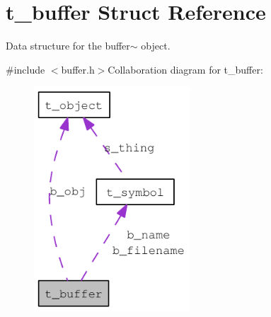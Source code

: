 \hypertarget{structt__buffer}{
\section{t\_\-buffer Struct Reference}
\label{structt__buffer}
}


Data structure for the buffer$\sim$ object.  


{\ttfamily \#include $<$buffer.h$>$}Collaboration diagram for t\_\-buffer:\nopagebreak
\begin{figure}[H]
\begin{center}
\leavevmode
\includegraphics[width=165pt]{structt__buffer__coll__graph}
\end{center}
\end{figure}
